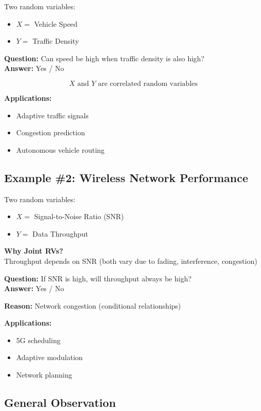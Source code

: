\documentclass[12pt]{article}
\begin{document}
Two random variables:
\begin{itemize}
    \item $X =$ Vehicle Speed
    \item $Y =$ Traffic Density
\end{itemize}

\textbf{Question:} Can speed be high when traffic density is also high?\\
\textbf{Answer:} Yes / No

\[
X \text{ and } Y \text{ are correlated random variables}
\]

\textbf{Applications:}
\begin{itemize}
    \item Adaptive traffic signals
    \item Congestion prediction
    \item Autonomous vehicle routing
\end{itemize}

\subsection*{Example \#2: Wireless Network Performance}

Two random variables:
\begin{itemize}
    \item $X =$ Signal-to-Noise Ratio (SNR)
    \item $Y =$ Data Throughput
\end{itemize}

\textbf{Why Joint RVs?}\\
Throughput depends on SNR (both vary due to fading, interference, congestion)

\textbf{Question:} If SNR is high, will throughput always be high?\\
\textbf{Answer:} Yes / No

\textbf{Reason:} Network congestion (conditional relationships)

\textbf{Applications:}
\begin{itemize}
    \item 5G scheduling
    \item Adaptive modulation
    \item Network planning
\end{itemize}

\subsection*{General Observation}
\end{document}
